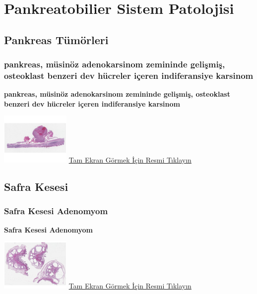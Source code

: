 \documentclass[
  letterpaper,
  DIV=11,
  numbers=noendperiod]{scrreprt}
\begin{document}
\part{Pankreatobilier Sistem Patolojisi}

\hypertarget{sec-pankreas-tumorleri}{%
\chapter{Pankreas Tümörleri}\label{sec-pankreas-tumorleri}}

\hypertarget{sec-pankreas-musinous-adenokarsinom-osteoklast}{%
\section{pankreas, müsinöz adenokarsinom zemininde gelişmiş, osteoklast
benzeri dev hücreler içeren indiferansiye
karsinom}\label{sec-pankreas-musinous-adenokarsinom-osteoklast}}

\textbf{pankreas, müsinöz adenokarsinom zemininde gelişmiş, osteoklast
benzeri dev hücreler içeren indiferansiye karsinom}

\href{https://images.patolojiatlasi.com/pancreas-undifferentiated-osteoclast/HE.html}{\includegraphics[width=0.25\textwidth,height=\textheight]{./screenshots/pancreas-undifferentiated-osteoclast_screenshot.png}}
\href{https://images.patolojiatlasi.com/pancreas-undifferentiated-osteoclast/HE.html}{Tam
Ekran Görmek İçin Resmi Tıklayın}

\hypertarget{sec-safra-kesesi}{%
\chapter{Safra Kesesi}\label{sec-safra-kesesi}}

\hypertarget{sec-safra-kesesi-adenomyom}{%
\section{Safra Kesesi Adenomyom}\label{sec-safra-kesesi-adenomyom}}

\textbf{Safra Kesesi Adenomyom}

\href{https://images.patolojiatlasi.com/gallbladder-adenomyoma/HE.html}{\includegraphics[width=0.25\textwidth,height=\textheight]{./screenshots/gallbladder-adenomyoma_screenshot.png}}
\href{https://images.patolojiatlasi.com/gallbladder-adenomyoma/HE.html}{Tam
Ekran Görmek İçin Resmi Tıklayın}
\end{document}
